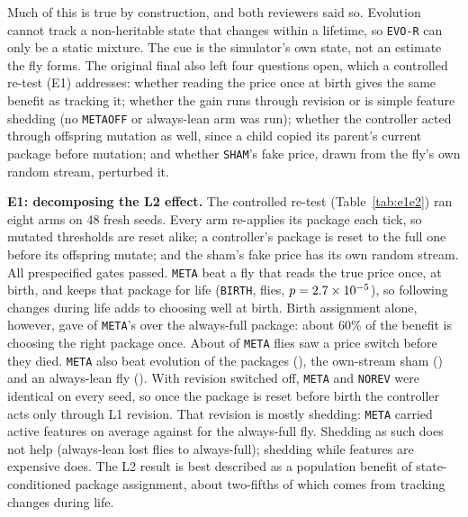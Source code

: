 \documentclass[11pt]{article}
\begin{document}
Much of this is true by construction, and both reviewers said so. Evolution cannot track a non-heritable state that changes within a lifetime, so \texttt{EVO-R} can only be a static mixture. The cue is the simulator's own state, not an estimate the fly forms. The original final also left four questions open, which a controlled re-test (E1) addresses: whether reading the price once at birth gives the same benefit as tracking it; whether the gain runs through revision or is simple feature shedding (no \texttt{METAOFF} or always-lean arm was run); whether the controller acted through offspring mutation as well, since a child copied its parent's current package before mutation; and whether \texttt{SHAM}'s fake price, drawn from the fly's own random stream, perturbed it.

\textbf{E1: decomposing the L2 effect.} The controlled re-test (Table~\ref{tab:e1e2}) ran eight arms on 48 fresh seeds. Every arm re-applies its package each tick, so mutated thresholds are reset alike; a controller's package is reset to the full one before its offspring mutate; and the sham's fake price has its own random stream. All prespecified gates passed. \texttt{META} beat a fly that reads the true price once, at birth, and keeps that package for life (\texttt{BIRTH}, \EoneBirthMean{} flies, $p = 2.7 \times 10^{-5}$), so following changes during life adds to choosing well at birth. Birth assignment alone, however, gave \EoneBirthFixedMean{} of \texttt{META}'s \EoneFixedMean{} over the always-full package: about 60\% of the benefit is choosing the right package once. About \EoneSwitchedMeta{} of \texttt{META} flies saw a price switch before they died. \texttt{META} also beat evolution of the packages (\EoneEvorMean), the own-stream sham (\EoneShamMean) and an always-lean fly (\EoneLeanMean). With revision switched off, \texttt{META} and \texttt{NOREV} were identical on every seed, so once the package is reset before birth the controller acts only through L1 revision. That revision is mostly shedding: \texttt{META} carried \EoneFeatMeta{} active features on average against \EoneFeatFixed{} for the always-full fly. Shedding as such does not help (always-lean lost \EoneLeanFixedMean{} flies to always-full); shedding while features are expensive does. The L2 result is best described as a population benefit of state-conditioned package assignment, about two-fifths of which comes from tracking changes during life.
\end{document}
